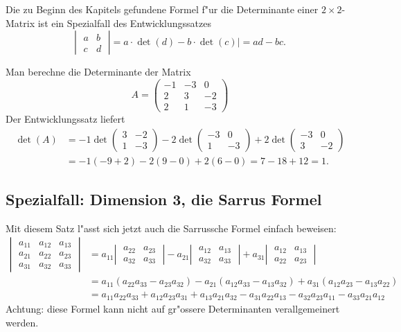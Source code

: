\begin{beispiel}Die zu Beginn des Kapitels gefundene Formel f"ur
die Determinante einer $2\times 2$-Matrix ist ein Spezialfall
des Entwicklungssatzes
\[
\left|\;
\begin{matrix}
a&b\\c&d
\end{matrix}
\;\right|
=a\cdot\det(d)-b\cdot\det(c)|=ad-bc.
\]
\end{beispiel}

\begin{beispiel}
Man berechne die Determinante der Matrix
\[
A=\begin{pmatrix}
-1&-3&0\\
2&3&-2\\
2&1&-3
\end{pmatrix}
\]
Der Entwicklungssatz liefert
\begin{align*}
\det(A)&=
-1\det\begin{pmatrix}3&-2\\1&-3\end{pmatrix}
-2\det\begin{pmatrix}-3&0\\1&-3\end{pmatrix}
+2\det\begin{pmatrix}-3&0\\3&-2\end{pmatrix}
\\
&=
-1(-9+2)-2(9-0)+2(6-0)=7-18+12=1.
\end{align*}
\end{beispiel}

\subsection{Spezialfall: Dimension 3, die Sarrus Formel}
Mit diesem Satz l"asst sich jetzt auch die Sarrussche Formel einfach beweisen:
\begin{align*}
\left|\;
\begin{matrix}
a_{11}&a_{12}&a_{13}\\
a_{21}&a_{22}&a_{23}\\
a_{31}&a_{32}&a_{33}
\end{matrix}\;\right|
&=
a_{11}
\left|\;\begin{matrix}
a_{22}&a_{23}\\
a_{32}&a_{33}
\end{matrix}\;\right|
-
a_{21}
\left|\;\begin{matrix}
a_{12}&a_{13}\\
a_{32}&a_{33}
\end{matrix}\;\right|
+
a_{31}
\left|\;\begin{matrix}
a_{12}&a_{13}\\
a_{22}&a_{23}
\end{matrix}\;\right|
\\
&=a_{11}(a_{22}a_{33}-a_{23}a_{32})
-a_{21}(a_{12}a_{33}-a_{13}a_{32})
+a_{31}(a_{12}a_{23}-a_{13}a_{22})
\\
&=
a_{11}a_{22}a_{33}+a_{12}a_{23}a_{31}+a_{13}a_{21}a_{32}
-a_{31}a_{22}a_{13}-a_{32}a_{23}a_{11}-a_{33}a_{21}a_{12}
\end{align*}
Achtung: diese Formel kann nicht auf gr"ossere Determinanten
verallgemeinert werden.

